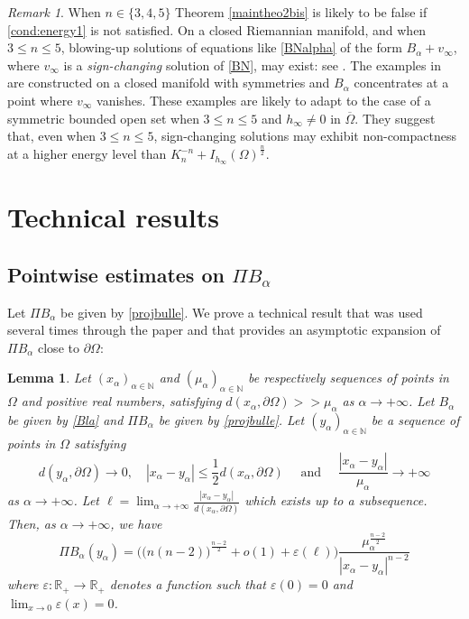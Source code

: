 \documentclass[10pt]{amsart}
\numberwithin{equation}{section}
\newcommand{\R}{\mathbb{R}}
\newcommand{\ve}{\varepsilon}
\newcommand{\Om}{\Omega}
\newcommand{\ma}{\mu_\alpha}
\def \xl{x_\alpha}
\def \ma{\mu_{\alpha}}
\def \hi{h_{\infty}}
\def \nn{\mathbb{N}}
\theoremstyle{plain}
\newtheorem{lemme}{Lemma}[section]%
\theoremstyle{remark}
\newtheorem{rem}{Remark}[section]
\begin{document}
 \begin{rem}
 When $n \in \{3,4,5\}$ Theorem \ref{maintheo2bis} is likely to be false if \eqref{cond:energy1} is not satisfied. On a closed Riemannian manifold, and when $3 \le n \le 5$, blowing-up solutions of equations like \eqref{BNalpha} of the form $B_\alpha + v_\infty$, where $v_\infty$ is a \emph{sign-changing} solution of \eqref{BN}, may exist: see  \cite[Theorem 1.4]{PremoselliVetois2}. The examples in \cite[Theorem 1.4]{PremoselliVetois2} are constructed on a closed manifold with symmetries and $B_\alpha$ concentrates at a point where $v_\infty$ vanishes. These examples are likely to adapt to the case of a symmetric bounded open set when $3 \le n \le 5$ and $h_\infty \neq 0$ in $\overline{\Om}$. They suggest that, even when $3 \le n \le 5$, sign-changing solutions may exhibit non-compactness at a higher energy level than $K_{n}^{-n}+I_{\hi}(\Om)^{\frac{n}{2}}$.  \end{rem}
 
 \appendix

\section{Technical results} \label{annexe}

\subsection{Pointwise estimates on $\Pi B_\alpha$}

Let $\Pi B_\alpha$ be given by \eqref{projbulle}. We prove a technical result that was used several times through the paper and that provides an asymptotic expansion of $\Pi B_\alpha$ close to $\partial \Om$: 
\begin{lemme} \label{lem:controleprojbulle}
Let $(\xl)_{\alpha \in \nn}$ and $(\ma)_{\alpha \in \nn}$ be respectively sequences of points in $\Om$ and positive real numbers, satisfying $d(x_\alpha, \partial \Om) >> \ma$ as $\alpha \to + \infty$. Let $B_\alpha$ be given by \eqref{Bla} and $\Pi B_\alpha$ be given by  \eqref{projbulle}. Let $(y_\alpha)_{\alpha \in \mathbb{N}}$ be a sequence of points in $\Omega$ satisfying 
\begin{equation} \label{lem:appendix1}
d(y_\alpha, \partial \Om) \to 0, \quad  |x_\alpha - y_\alpha| \le \frac12 d(x_\alpha, \partial \Om) \quad \text{ and } \quad \frac{|x_\alpha - y_\alpha|}{\ma} \to + \infty 
\end{equation}
as $\alpha \to + \infty$. Let $\ell = \lim_{\alpha \to + \infty} \frac{ |x_\alpha - y_\alpha|}{d(x_\alpha, \partial \Om)}$ which exists up to a subsequence. Then, as $\alpha \to + \infty$, we have
$$ \Pi B_\alpha(y_\alpha) = \Big( \big( n(n-2) \big)^{\frac{n-2}{2}} +o(1) + \ve(\ell) \Big) \frac{\ma^{\frac{n-2}{2}} }{|x_\alpha - y_\alpha|^{n-2}} $$
where $\ve: \R_+ \to \R_+$ denotes a function such that $\ve(0) = 0$ and $\lim_{x \to 0} \ve(x) = 0$. 
\end{lemme}
\end{document}
